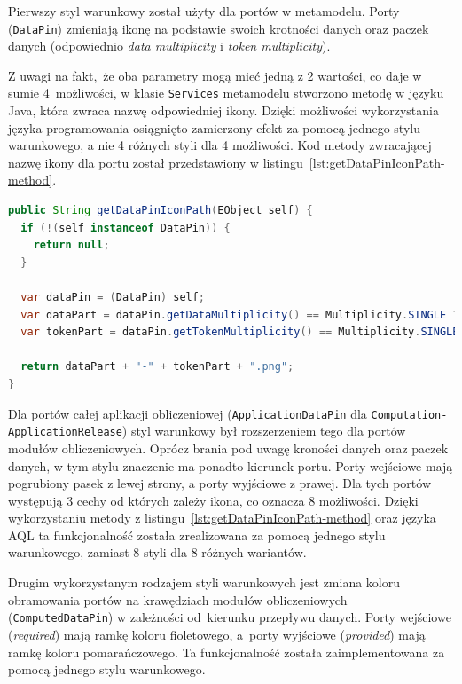 Pierwszy styl warunkowy został użyty dla portów w metamodelu. Porty
(\texttt{DataPin}) zmieniają ikonę na podstawie swoich krotności danych oraz
paczek danych (odpowiednio \emph{data multiplicity} i \emph{token
	multiplicity}).

Z uwagi na fakt, że oba parametry mogą mieć jedną z 2 wartości,
co daje w sumie 4~możliwości, w klasie \texttt{Services} metamodelu stworzono
metodę w języku Java, która zwraca nazwę odpowiedniej ikony.
Dzięki możliwości wykorzystania języka programowania osiągnięto
zamierzony efekt za pomocą jednego stylu warunkowego, a nie 4 różnych
styli dla 4 możliwości. Kod metody zwracającej nazwę ikony dla portu
został przedstawiony w listingu~\ref{lst:getDataPinIconPath-method}.

\begin{lstlisting}[float,
    floatplacement=ht,
    language=Java,
    caption={Methoda zwracająca nazwę ikony dla portu.},
    label={lst:getDataPinIconPath-method}]
public String getDataPinIconPath(EObject self) {
  if (!(self instanceof DataPin)) {
    return null;
  }

  var dataPin = (DataPin) self;
  var dataPart = dataPin.getDataMultiplicity() == Multiplicity.SINGLE ? "single-data" : "multiple-data";
  var tokenPart = dataPin.getTokenMultiplicity() == Multiplicity.SINGLE ? "single-token" : "multiple-tokens";

  return dataPart + "-" + tokenPart + ".png";
}
\end{lstlisting}

Dla portów całej aplikacji obliczeniowej (\texttt{ApplicationDataPin} dla
\texttt{Computation-\linebreak ApplicationRelease}) styl warunkowy był
rozszerzeniem tego
dla portów modułów obliczeniowych. Oprócz brania pod uwagę kroności danych oraz
paczek danych, w tym stylu znaczenie ma ponadto kierunek portu. Porty wejściowe
mają pogrubiony pasek z lewej strony, a porty wyjściowe z prawej. Dla tych
portów występują 3 cechy od których zależy ikona, co oznacza 8 możliwości.
Dzięki wykorzystaniu metody z listingu~\ref{lst:getDataPinIconPath-method} oraz
języka \gls{AQL} ta funkcjonalność została zrealizowana za pomocą jednego stylu
warunkowego, zamiast 8 styli dla 8 różnych wariantów.

Drugim wykorzystanym rodzajem styli warunkowych jest zmiana koloru obramowania
portów na krawędziach modułów obliczeniowych (\texttt{ComputedDataPin}) w
zależności od~kierunku przepływu danych. Porty wejściowe (\emph{required}) mają
ramkę koloru fioletowego, a~porty wyjściowe (\emph{provided}) mają ramkę koloru
pomarańczowego. Ta funkcjonalność została zaimplementowana za pomocą jednego
stylu warunkowego.

